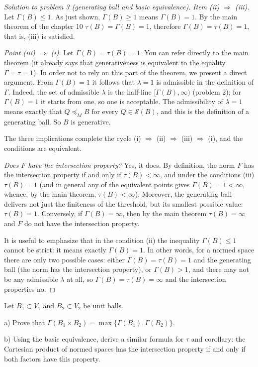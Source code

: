 \documentclass[a4paper,12pt]{report}
\begin{document}
\begin{proof}[Solution to problem \textup{3} \textup{(}generating ball and basic equivalence\textup{)}]
\textit{Item \textup{(ii)} $\Rightarrow$ \textup{(iii)}.} Let $\Gamma(B)\le1$. As just shown, $\Gamma(B)\ge1$ means $\Gamma(B)=1$. By the main theorem of the chapter \textup{10} $\tau(B)=\Gamma(B)=1$, therefore $\Gamma(B)=\tau(B)=1$, that is, \textup{(iii)} is satisfied.

\textit{Point \textup{(iii)} $\Rightarrow$ \textup{(i)}.} Let $\Gamma(B)=\tau(B)=1$. You can refer directly to the main theorem \textup{(}it already says that generativeness is equivalent to the equality $\Gamma=\tau=1$\textup{)}. In order not to rely on this part of the theorem, we present a direct argument. From $\Gamma(B)=1$ it follows that $\lambda=1$ is admissible in the definition of $\Gamma$. Indeed, the set of admissible $\lambda$ is the half-line $[\Gamma(B),\infty)$ \textup{(}problem \textup{2}\textup{)}; for $\Gamma(B)=1$ it starts from one, so one is acceptable. The admissibility of $\lambda=1$ means exactly that $Q\preceq_M B$ for every $Q\in\mathcal S(B)$, and this is the definition of a generating ball. So $B$ is generative.

The three implications complete the cycle \textup{(i)} $\Rightarrow$ \textup{(ii)} $\Rightarrow$ \textup{(iii)} $\Rightarrow$ \textup{(i)}, and the conditions are equivalent.

\textit{Does $F$ have the intersection property?} Yes, it does. By definition, the norm $F$ has the intersection property if and only if $\tau(B)<\infty$, and under the conditions \textup{(iii)} $\tau(B)=1$ \textup{(}and in general any of the equivalent points gives $\Gamma(B)=1<\infty$, whence, by the main theorem, $\tau(B)<\infty$\textup{)}. Moreover, the generating ball delivers not just the finiteness of the threshold, but its smallest possible value\textup{:} $\tau(B)=1$. Conversely, if $\Gamma(B)=\infty$, then by the main theorem $\tau(B)=\infty$ and $F$ do not have the intersection property.

It is useful to emphasize that in the condition \textup{(ii)} the inequality $\Gamma(B)\le1$ cannot be strict\textup{:} it means exactly $\Gamma(B)=1$. In other words, for a normed space there are only two possible cases\textup{:} either $\Gamma(B)=\tau(B)=1$ and the generating ball \textup{(}the norm has the intersection property\textup{)}, or $\Gamma(B)>1$, and there may not be any admissible $\lambda$ at all, so $\Gamma(B)=\tau(B)=\infty$ and the intersection properties no.

\end{proof}

\begin{task}
Let $B_1\subset V_1$ and $B_2\subset V_2$ be unit balls.

\textup{a)} Prove that $\Gamma(B_1\times B_2)=\max\{\Gamma(B_1),\Gamma(B_2)\}$.

\textup{b)} Using the basic equivalence, derive a similar formula for $\tau$ and corollary\textup{:} the Cartesian product of normed spaces has the intersection property if and only if both factors have this property.

\end{task}
\end{document}
